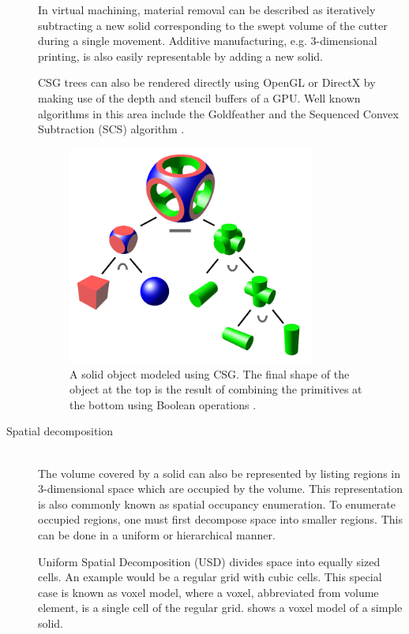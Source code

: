 \begin{description}
	In virtual machining, material removal can be described as iteratively subtracting a new solid corresponding to the swept volume of the cutter during a single movement.
	Additive manufacturing, e.g. 3-dimensional printing, is also easily representable by adding a new solid.

	CSG trees can also be rendered directly using OpenGL or DirectX by making use of the depth and stencil buffers of a GPU.
	Well known algorithms in this area include the Goldfeather \cite{goldfeather} and the Sequenced Convex Subtraction (SCS) algorithm \cite{scs}.

	\begin{figure}[H]
		\centering
		\includegraphics[width=0.8\textwidth]{images/csg_tree}
		\caption[CSG tree]{
			A solid object modeled using CSG.
			The final shape of the object at the top is the result of combining the primitives at the bottom using Boolean operations \cite{csg_tree}.
		}
		\label{fig:csg_tree}
	\end{figure}

	\item[Spatial decomposition] \hfill \\
	The volume covered by a solid can also be represented by listing regions in 3-dimensional space which are occupied by the volume.
	This representation is also commonly known as spatial occupancy enumeration.
	To enumerate occupied regions, one must first decompose space into smaller regions.
	This can be done in a uniform or hierarchical manner.

	Uniform Spatial Decomposition (USD) divides space into equally sized cells.
	An example would be a regular grid with cubic cells.
	This special case is known as voxel model, where a voxel, abbreviated from volume element, is a single cell of the regular grid.
	 shows a voxel model of a simple solid.


\end{description}
